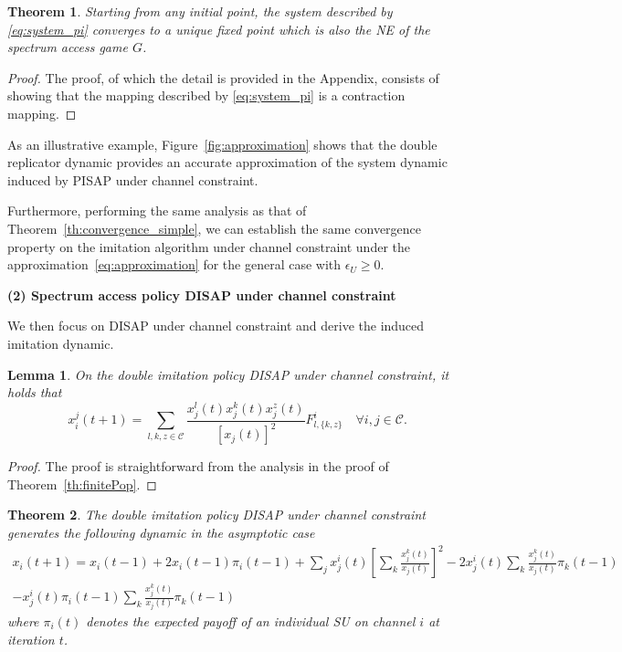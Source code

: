 \documentclass[12pt, onecolumn]{IEEEtran}
\theoremstyle{plain}
\newtheorem{lemma}{Lemma}
\newtheorem{theorem}{Theorem}
\theoremstyle{definition}
\begin{document}
\begin{theorem}
Starting from any initial point, the system described by \eqref{eq:system_pi} converges to a unique fixed point which is also the NE of the spectrum access game $G$.
\label{th:convergence_pi_2}
\end{theorem}

\begin{proof}
The proof, of which the detail is provided in the Appendix, consists of showing that the mapping described by \eqref{eq:system_pi} is a contraction mapping.
\end{proof}

As an illustrative example, Figure~\ref{fig:approximation} shows that the double replicator dynamic provides an accurate approximation of the system dynamic induced by PISAP under channel constraint.









Furthermore, performing the same analysis as that of Theorem~\ref{th:convergence_simple}, we can establish the same convergence property on the imitation algorithm under channel constraint under the approximation~\eqref{eq:approximation} for the general case with $\epsilon_U\ge 0$.

\noindent \textbf{(2) Spectrum access policy DISAP under channel constraint}

We then focus on DISAP under channel constraint and derive the induced imitation dynamic.

\begin{lemma}
On the double imitation policy DISAP under channel constraint, it holds that
\begin{equation}
x_i^j(t+1) = \sum_{l,k,z \in \mathcal{C}}  \frac{x_j^l(t)x_j^k(t)x_j^z(t)}{[x_j(t)]^2}F_{l,\{k,z\} }^{i} \quad \forall i,j\in \mathcal{C}.
\label{xijlemma2}
\end{equation}
\label{lemma:pop3}
\end{lemma}
\begin{proof}
The proof is straightforward from the analysis in the proof of Theorem~\ref{th:finitePop}.
\end{proof}






\begin{theorem}
The double imitation policy DISAP under channel constraint generates the following dynamic in the asymptotic case
\begin{multline}
\label{eq:pop3}
x_i(t+1) = x_i(t-1)+2x_i(t-1)\pi_i(t-1)+\sum_jx_j^i(t)\left[ \sum_k\frac{x_j^k(t)}{x_j(t)}\right]^2-2x_j^i(t)\sum_k\frac{x_j^k(t)}{x_j(t)}\pi_k(t-1)\\
-x_j^i(t)\pi_i(t-1)\sum_k\frac{x_j^k(t)}{x_j(t)}\pi_k(t-1)
\end{multline}
where $\pi_i(t)$ denotes the expected payoff of an individual SU on channel $i$ at iteration $t$.
\label{th:pop3}
\end{theorem}
\end{document}
